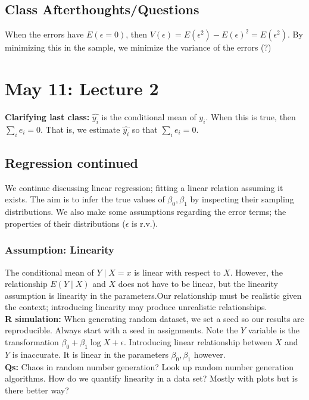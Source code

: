 \documentclass[12pt, a4paper]{article}
\theoremstyle{definition}
\newcommand{\eps}{\epsilon}
\begin{document}
	\subsection{Class Afterthoughts/Questions}
	When the errors have $E(\eps = 0)$, then $V(\eps) = E(\eps^2) - E(\eps)^2 = E(\eps^2)$. By minimizing this in the sample, we minimize the variance of the errors (?)
	
	\section{May 11: Lecture 2}
	{\bf Clarifying last class:} $\hat{y_i}$ is the conditional mean of $y_i$. When this is true, then $\sum_i e_i = 0$. That is, we estimate $\hat{y_i}$ so that $\sum_i e_i = 0$. 
	
	\subsection{Regression continued}
	We continue discussing linear regression; fitting a linear relation assuming it exists. The aim is to infer the true values of $\beta_0, \beta_1$ by inspecting their sampling distributions. We also make some assumptions regarding the error terms; the properties of their distributions ($\eps$ is r.v.).
	
	\subsubsection{Assumption: Linearity}
	The conditional mean of $Y \mid X = x$ is linear with respect to $X$. However, the relationship $E(Y \mid X)$ and $X$ does not have to be linear, but the linearity assumption is linearity in the parameters.Our relationship must be realistic given the context; introducing linearity may produce unrealistic relationships.\\
	
	{\bf R simulation: } When generating random dataset, we set a seed so our results are reproducible. Always start with a seed in assignments. Note the $Y$ variable is the transformation $\beta_0 + \beta_1 \log X + \eps$. Introducing linear relationship between $X$ and $Y$ is inaccurate. It is linear in the parameters $\beta_0, \beta_1$ however.\\
	
	{\bf Qs:} Chaos in random number generation? Look up random number generation algorithms. How do we quantify linearity in a data set? Mostly with plots but is there better way?
	
\end{document}

